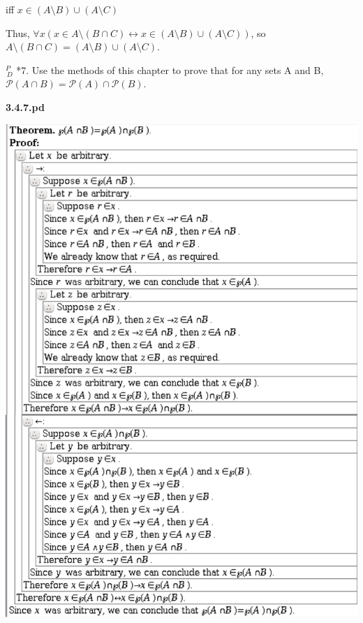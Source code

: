 \documentclass{article}
\begin{document}
\quad \quad \quad \quad \quad \quad \quad iff $x \in (A \setminus B) \cup (A \setminus C)$

Thus, $\forall x (x \in A \setminus (B \cap C) \leftrightarrow x \in (A \setminus B) \cup (A \setminus C))$, so $A \setminus (B \cap C) = (A \setminus B) \cup (A \setminus C)$.

\vspace{30pt}

$^{\textit{P}}_{\, \textit{D}}$ *7. Use the methods of this chapter to prove that for any sets A and B, $\mathcal{P} (A \cap B) = \mathcal{P} (A) \cap \mathcal{P} (B)$.
\vspace{30pt}

\textbf{3.4.7.pd}
\vspace{10pt}

\includegraphics[width=\textwidth]{3_4_7}

\vspace{30pt}
\end{document}

